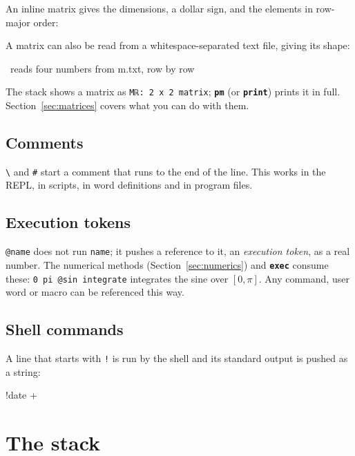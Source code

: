 \documentclass[11pt,letterpaper]{article}
\newcommand{\code}[1]{\texttt{#1}}
\newcommand{\g}[1]{{\mathglyphs #1}}   %
\newcommand{\cmd}[1]{\texttt{\textbf{#1}}}
\begin{document}
An inline matrix gives the dimensions, a dollar sign, and the elements in row-major order:
A matrix can also be read from a whitespace-separated text file, giving its shape:
\begin{rpn}
[2, 2, "m.txt"]              \ reads four numbers from m.txt, row by row
\end{rpn}
The stack shows a matrix as \code{M\g{ℝ}: 2 x 2 matrix}; \cmd{pm} (or \cmd{print}) prints it in full. Section~\ref{sec:matrices} covers what you can do with them.

\subsection{Comments}

\code{\textbackslash} and \code{\#} start a comment that runs to the end of the line. This works in the REPL, in scripts, in word definitions and in program files.

\subsection{Execution tokens}

\code{@name} does not run \code{name}; it pushes a reference to it, an \emph{execution token}, as a real number. The numerical methods (Section~\ref{sec:numerics}) and \cmd{exec} consume these: \code{0 pi @sin integrate} integrates the sine over $[0,\pi]$. Any command, user word or macro can be referenced this way.

\subsection{Shell commands}

A line that starts with \code{!} is run by the shell and its standard output is pushed as a string:
\begin{rpn}
!date +%
\end{rpn}

\section{The stack}
\end{document}
